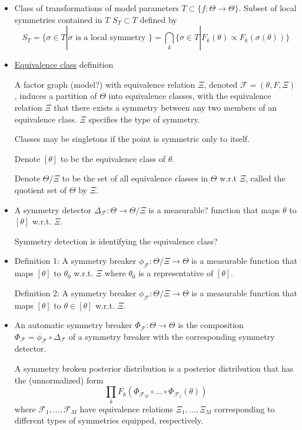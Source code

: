 \documentclass{article}
\begin{document}
\begin{itemize}

\item
Class of transformations of model parameters $T\subset\{f:\Theta\rightarrow\Theta\}$. Subset of local symmetries contained in $T$ $S_T\subset T$ defined by
\[
S_T=\{\sigma\in T|\sigma \text{ is a local symmetry }\} = \bigcap_k\{\sigma\in T | F_k(\theta)\propto F_k\left(\sigma(\theta)\right)\}
\]

\item
\href{https://en.wikipedia.org/wiki/Equivalence_class}{Equivalence class} definition

A factor graph (model?) with equivalence relation $\Xi$, denoted $\mathcal{F}=(\theta,F,\Xi)$, induces a partition of $\Theta$ into equivalence classes, with the equivalence relation $\Xi$ that there exists a symmetry between any two members of an equivalence class. $\Xi$ specifies the type of symmetry.

Classes may be singletons if the point is symmetric only to itself.

Denote $[\theta]$ to be the equivalence class of $\theta$.

Denote $\Theta/\Xi$ to be the set of all equivalence classes in $\Theta$ w.r.t $\Xi$, called the quotient set of $\Theta$ by $\Xi$.

\item
A symmetry detector $\Delta_\mathcal{F}:\Theta\rightarrow\Theta/\Xi$ is a measurable? function that maps $\theta$ to $[\theta]$ w.r.t. $\Xi$.

Symmetry detection is identifying the equivalence class?

\item
Definition 1: A symmetry breaker $\phi_\mathcal{F}:\Theta/\Xi\rightarrow\Theta$ is a measurable function that maps $[\theta]$ to $\theta_0$ w.r.t. $\Xi$ where $\theta_0$ is a representative of $[\theta]$.

Definition 2: A symmetry breaker $\phi_\mathcal{F}:\Theta/\Xi\rightarrow\Theta$ is a measurable function that maps $[\theta]$ to $\theta\in[\theta]$ w.r.t. $\Xi$.

\item
An automatic symmetry breaker $\Phi_\mathcal{F}:\Theta\rightarrow\Theta$ is the composition $\Phi_\mathcal{F}=\phi_\mathcal{F}\circ\Delta_\mathcal{F}$ of a symmetry breaker with the corresponding symmetry detector.

A symmetry broken posterior distribution is a posterior distribution that has the (unnormalized) form
\[
\prod_kF_k(\Phi_{\mathcal{F}_M}\circ ... \circ \Phi_{\mathcal{F}_1}(\theta))
\]
where $\mathcal{F}_1,...,\mathcal{F}_M$ have equivalence relations $\Xi_1,...,\Xi_M$ corresponding to different types of symmetries equipped, respectively.


\end{itemize}
\end{document}
